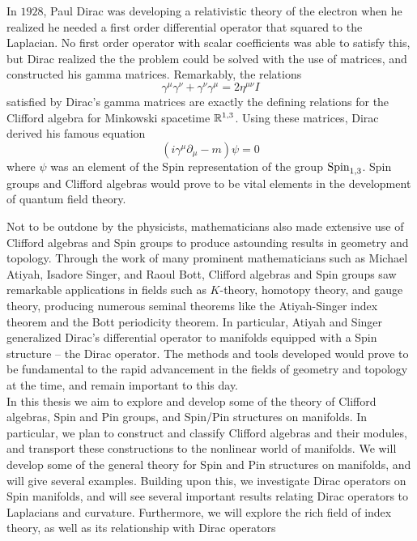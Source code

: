In $1928$, Paul Dirac was developing a relativistic theory of the electron
when he realized he needed a first order differential operator that squared
to the Laplacian. No first order operator with scalar coefficients was able
to satisfy this, but Dirac realized the the problem could be solved with
the use of matrices, and constructed his gamma matrices. Remarkably, the
relations
\[
\gamma^\mu\gamma^\nu + \gamma^\nu\gamma^\mu = 2\eta^{\mu\nu}I
\]
satisfied by Dirac's gamma matrices are exactly the defining relations for the
Clifford algebra for Minkowski spacetime $\mathbb{R}^{1,3}$. Using these matrices, Dirac
derived his famous equation
\[
(i\gamma^\mu\partial_\mu -m)\psi = 0
\]
where $\psi$ was an element of the Spin representation of the group $\mathrm{Spin}_{1,3}$.
Spin groups and Clifford algebras would prove to be vital elements in the development
of quantum field theory.

Not to be outdone by the physicists, mathematicians also made extensive use
of Clifford algebras and Spin groups to produce astounding results in geometry
and topology. Through the work of many prominent mathematicians such as Michael
Atiyah, Isadore Singer, and Raoul Bott, Clifford algebras and Spin groups saw
remarkable applications in fields such as $K$-theory, homotopy theory, and
gauge theory, producing numerous seminal theorems like the Atiyah-Singer index
theorem and the Bott periodicity theorem. In particular, Atiyah and Singer
generalized Dirac's differential operator to manifolds equipped with a Spin
structure -- the Dirac operator. The methods and tools developed would prove
to be fundamental to the rapid advancement in the fields of geometry and topology
at the time, and remain important to this day. \\

In this thesis we aim to explore and develop some of the theory of
Clifford algebras, Spin and Pin groups, and Spin/Pin structures on manifolds.
In particular, we plan to construct and classify Clifford algebras and their
modules, and transport these constructions to the nonlinear world of manifolds.
We will develop some of the general theory for Spin and Pin structures on manifolds,
and will give several examples. Building upon this, we investigate Dirac operators on
Spin manifolds, and will see several important results relating Dirac operators
to Laplacians and curvature. Furthermore, we will explore the rich field of
index theory, as well as its relationship with Dirac operators
%